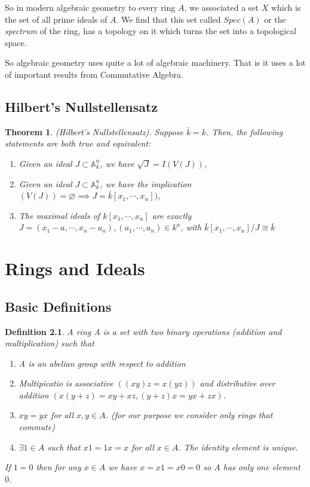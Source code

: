 \documentclass[]{report}
\newtheorem{theorem}{Theorem}[section]
\newtheorem{defn}[theorem]{Definition}
\begin{document}
So in modern algebraic geometry to every ring $A$, we associated a set $X$ which is the set of all prime ideals of $A$. We find that this set called $Spec(A)$ or the \textit{spectrum} of the ring, has a topology on it which turns the set into a topological space. 

So algebraic geometry uses quite a lot of algebraic machinery. That is it uses a lot of important results from Commutative Algebra. 

\section{Hilbert's Nullstellensatz}

\begin{theorem}
    (Hilbert's Nullstellensatz). Suppose $\bar{k} = k$. Then, the following statements are both true and equivalent:
    \begin{enumerate}
        \item Given an ideal $J\subset \mathbb{A}^n_k$, we have $\sqrt{J} = I(V(J))$,
        \item Given an ideal $J\subset \mathbb{A}^n_k$, we have the implication $(V(J)) = \varnothing \implies J = \bar{k}[x_1,\cdots,x_n])$,
        \item The maximal ideals of $k[x_1,\cdots,x_n]$ are exactly $J = (x_1-a,\cdots, x_n-a_n), (a_1,\cdots,a_n)\in k^n$, with $\bar{k}[x_1,\cdots,x_n]/J \cong \bar{k}$
    \end{enumerate}
\end{theorem}


\chapter{Rings and Ideals}
\section{Basic Definitions}
\begin{defn} 
    A ring A is a set with two binary operations (addition and multiplication) such that
\begin{enumerate}
    \item A is an abelian group with respect to addition
    \item Multipicatio is associative $((xy)z = x(yz))$ and distributive over addition $(x(y+z) = xy+xz, (y+z)x = yx + zx)$.  
    \item $xy=yx$ for all $x,y\in A$. (for our purpose we consider only rings that commute)
    \item $\exists 1\in A$ such that $x1 = 1x = x$ for all $x\in A$. 
The identity element is unique. 
\end{enumerate}

If $1=0$ then for any $x\in A$ we have $x=x1=x0 =0$ so $A$ has only one element $0$.
\end{defn}
\end{document}
